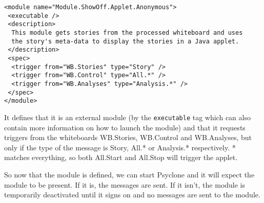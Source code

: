 \begin{verbatim}
<module name="Module.ShowOff.Applet.Anonymous">
 <executable />
 <description>
  This module gets stories from the processed whiteboard and uses 
  the story's meta-data to display the stories in a Java applet.
 </description>
 <spec>
  <trigger from="WB.Stories" type="Story" />
  <trigger from="WB.Control" type="All.*" />
  <trigger from="WB.Analyses" type="Analysis.*" />
 </spec>
</module>
\end{verbatim}

It defines that it is an external module (by the \texttt{executable} tag which
can also contain more information on how to launch the module) and that it
requests triggers from the whiteboards WB.Stories, WB.Control and WB.Analyses,
but only if the type of the message is Story, All.* or Analysis.* respectively.
* matches everything, so both All.Start and All.Stop will trigger the applet.

So now that the module is defined, we can start Psyclone and it will expect the
module to be present. If it is, the messages are sent. If it isn't, the module
is temporarily deactivated until it signs on and no messages are sent to the
module.

